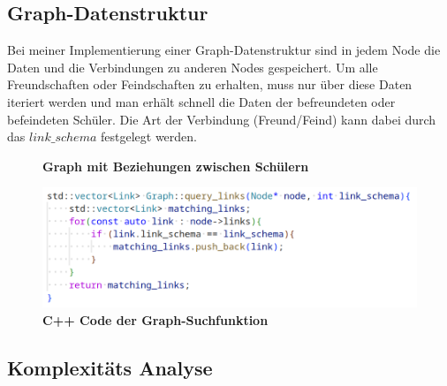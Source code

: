 \documentclass[11pt,a4paper]{article}
\begin{document}
\subsection{Graph-Datenstruktur}

Bei meiner Implementierung einer Graph-Datenstruktur sind in jedem Node
die Daten und die Verbindungen zu anderen Nodes gespeichert.
Um alle Freundschaften oder Feindschaften zu erhalten, muss nur über diese
Daten iteriert werden und man erhält schnell die Daten der befreundeten oder
befeindeten Schüler. Die Art der Verbindung (Freund/Feind) kann dabei durch
das $link\_schema$ festgelegt werden.

\begin{figure}[H]
    \centering
    \caption{\textbf{Graph mit Beziehungen zwischen Schülern}}
\end{figure}

\vspace*{0.5cm}

\begin{figure}[H]
    \centering
    \includegraphics[width=1.0\textwidth]{./res/code_graphdb.png}
    \caption{\textbf{C++ Code der Graph-Suchfunktion}}
\end{figure}

\subsection{Komplexitäts Analyse}
\end{document}
